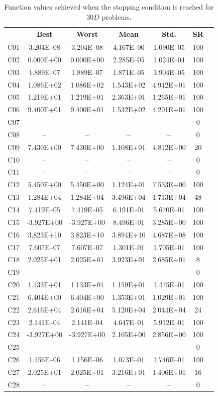 \documentclass[conference]{IEEEtran}
\begin{document}
% 
% 
% 
\begin{table}[!ht]
	\caption{Function values achieved when the stopping condition is reached for $30D$ problems.}
	\centering
	\begin{tabular}{|c|c|c|c|c|c|c|}
	\hline
     & Best & Worst & Mean & Std. & SR \\ \hline \hline
C01 & 3.204E--08 & 3.204E--08 & 4.167E--06 & 1.090E--05 &  100 \\ 
C02 & 0.000E+00 & 0.000E+00 & 2.285E--05 & 1.024E--04 &  100 \\ 
C03 & 1.889E--07 & 1.889E--07 & 1.871E--05 & 3.904E--05 &  100 \\ 
C04 & 1.086E+02 & 1.086E+02 & 1.543E+02 & 4.942E+01 &  100 \\ 
C05 & 1.219E+01 & 1.219E+01 & 2.363E+01 & 1.265E+01 &  100 \\ 
C06 & 9.400E+01 & 9.400E+01 & 1.532E+02 & 4.291E+01 &  100 \\ 
C07 &  -- &  -- &  -- &  -- &    0 \\ 
C08 &  -- &  -- &  -- &  -- &    0 \\ 
C09 & 7.430E+00 & 7.430E+00 & 1.108E+01 & 4.812E+00 &   20 \\ 
C10 &  -- &  -- &  -- &  -- &    0 \\ 
C11 &  -- &  -- &  -- &  -- &    0 \\ 
C12 & 5.450E+00 & 5.450E+00 & 1.124E+01 & 7.533E+00 &  100 \\ 
C13 & 1.284E+04 & 1.284E+04 & 3.496E+04 & 1.713E+04 &   48 \\ 
C14 & 7.419E--05 & 7.419E--05 & 6.191E--01 & 5.670E--01 &  100 \\ 
C15 & -3.927E+00 & -3.927E+00 & 8.496E--01 & 3.285E+00 &  100 \\ 
C16 & 3.823E+10 & 3.823E+10 & 3.894E+10 & 4.687E+08 &  100 \\ 
C17 & 7.607E--07 & 7.607E--07 & 1.301E--01 & 1.705E--01 &  100 \\ 
C18 & 2.025E+01 & 2.025E+01 & 3.923E+01 & 2.685E+01 &    8 \\ 
C19 &  -- &  -- &  -- &  -- &    0 \\ 
C20 & 1.133E+01 & 1.133E+01 & 1.159E+01 & 1.475E--01 &  100 \\ 
C21 & 6.404E+00 & 6.404E+00 & 1.353E+01 & 1.029E+01 &  100 \\ 
C22 & 2.616E+04 & 2.616E+04 & 5.120E+04 & 2.044E+04 &   24 \\ 
C23 & 2.141E--04 & 2.141E--04 & 4.647E--01 & 5.912E--01 &  100 \\ 
C24 & -3.927E+00 & -3.927E+00 & 2.105E+00 & 2.856E+00 &  100 \\ 
C25 &  -- &  -- &  -- &  -- &    0 \\ 
C26 & 1.156E--06 & 1.156E--06 & 1.073E--01 & 1.746E--01 &  100 \\ 
C27 & 2.025E+01 & 2.025E+01 & 3.216E+01 & 1.406E+01 &   16 \\ 
C28 &  -- &  -- &  -- &  -- &    0 \\ 
\hline
	\end{tabular}
	\label{tab:d30}
\end{table}
\end{document}
